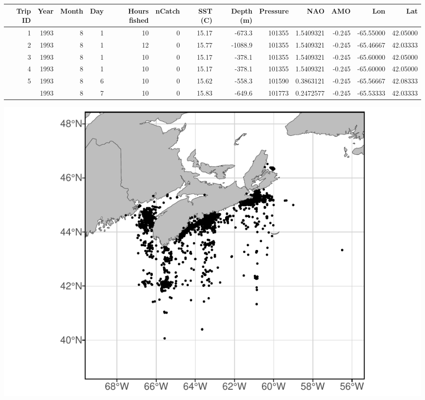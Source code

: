 \documentclass[
]{article}
\let\origfigure\figure
\let\endorigfigure\endfigure
\renewenvironment{figure}[1][2] {
    \expandafter\origfigure\expandafter[H]
} {
    \endorigfigure
}
\let\origtable\table
\let\endorigtable\endtable
\renewenvironment{table}[1][2] {
    \expandafter\origtable\expandafter[H]
} {
    \endorigtable
}
\begin{document}
\begin{landscape}\begin{table}[H]

\caption{\label{tab:mergecan}Canadian commercial data example}
\centering
\begin{tabular}[t]{rrrrrrrrrrrrr}
\toprule
Trip
ID & Year & Month & Day & Hours
fished & nCatch & SST
(C) & Depth
(m) & Pressure & NAO & AMO & Lon & Lat\\
\midrule
1 & 1993 & 8 & 1 & 10 & 0 & 15.17 & -673.3 & 101355 & 1.5409321 & -0.245 & -65.55000 & 42.05000\\
2 & 1993 & 8 & 1 & 12 & 0 & 15.77 & -1088.9 & 101355 & 1.5409321 & -0.245 & -65.46667 & 42.03333\\
3 & 1993 & 8 & 1 & 10 & 0 & 15.17 & -378.1 & 101355 & 1.5409321 & -0.245 & -65.60000 & 42.05000\\
4 & 1993 & 8 & 1 & 10 & 0 & 15.17 & -378.1 & 101355 & 1.5409321 & -0.245 & -65.60000 & 42.05000\\
5 & 1993 & 8 & 6 & 10 & 0 & 15.62 & -558.3 & 101590 & 0.3863121 & -0.245 & -65.56667 & 42.08333\\
\addlinespace
6 & 1993 & 8 & 7 & 10 & 0 & 15.83 & -649.6 & 101773 & 0.2472577 & -0.245 & -65.53333 & 42.03333\\
\bottomrule
\end{tabular}
\end{table}
\end{landscape}

\begin{figure}
\centering
\includegraphics{Model_Prelim_Report_files/figure-latex/canadianplot-1.pdf}
\caption{\label{fig:canadianplot}Fig. 3: Spatial distribution of Canadian commercial catch}
\end{figure}
\end{document}

